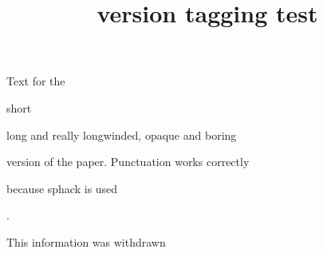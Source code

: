 \documentclass{article}
\title{version tagging test}
\begin{document}
Text for the
\begin{abridged}
short
\end{abridged}
\begin{unabridged}
long and really longwinded, opaque and boring
\end{unabridged}
version of the paper. Punctuation works correctly\begin{unabridged}
because sphack is used\end{unabridged}.
\begin{comment} This is deleted by default. \end{comment}
\begin{redact}This information was withdrawn\end{redact}
\end{document}

